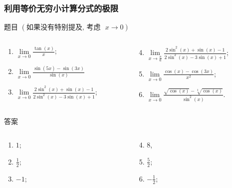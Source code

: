 \documentclass[
10pt,
aspectratio=43,
]{beamer}
\begin{document}
\begin{frame}
	\frametitle{利用等价无穷小计算分式的极限}
	\begin{block}{题目 $(\text{如果没有特别提及, 考虑 }\,\,x\to0)$}
		\begin{columns}[onlytextwidth]
			\begin{column}{0.5\textwidth}
				\begin{enumerate}
					\item $\lim\limits_{x \to 0} \frac{\tan(x)}{x}$;
					\item $\lim\limits_{x \to 0} \frac{\sin(5x) - \sin(3x)}{\sin(x)}$
					\item $\lim\limits_{x \to 0} \frac{2 \sin^2(x) + \sin(x) - 1}{2 \sin^2(x) - 3 \sin(x) + 1}$;
				\end{enumerate}
			\end{column}
			\begin{column}{0.5\textwidth}
				\begin{enumerate}
					\setcounter{enumi}{3}
					\item $\lim\limits_{x \to \frac{\pi}{6}} \frac{2 \sin^2(x) + \sin(x) - 1}{2 \sin^2(x) - 3 \sin(x) + 1}$;
					\item $\lim\limits_{x \to 0} \frac{\cos(x) - \cos(3x)}{x^2}$;
					\item $\lim\limits_{x \to 0} \frac{\sqrt{\cos(x)} - \sqrt[3]{\cos(x)}}{\sin^2(x)}$.
				\end{enumerate}
			\end{column}
		\end{columns}
	\end{block}
	\begin{exampleblock}{答案}
		\begin{columns}[onlytextwidth]
			\begin{column}{0.5\textwidth}
				\begin{enumerate}
					\item $1$;
					      \pause
					\item $\frac12$;
					      \pause
					\item $-1$;
				\end{enumerate}
			\end{column}
			\begin{column}{0.5\textwidth}
				\begin{enumerate}
					\setcounter{enumi}{3}
					\pause
					\item $8$,
					      \pause
					\item $\frac52$;
					      \pause
					\item $-\frac12$;
				\end{enumerate}
			\end{column}
		\end{columns}
	\end{exampleblock}
\end{frame}
\end{document}
